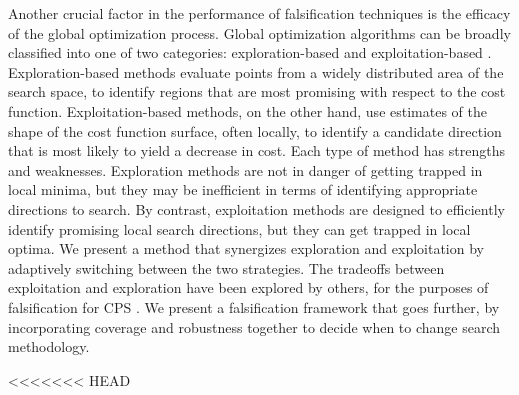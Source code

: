 

Another crucial factor in the performance of falsification techniques is the efficacy of the global optimization process.
Global optimization algorithms can be broadly classified into one of two
categories: exploration-based and exploitation-based \cite{Blum03}.
Exploration-based methods evaluate points from a widely distributed area 
of the search space, to identify regions that are most promising with 
respect to the cost function. Exploitation-based methods, on the other hand, 
use estimates of the shape of the cost function surface, often locally, to
identify a candidate direction that is most likely to yield a decrease
in cost. Each type of method has strengths and weaknesses. Exploration
methods are not in danger of getting trapped in local minima, but they may 
be inefficient in terms of identifying appropriate directions to search.  By
contrast, exploitation methods are designed to efficiently identify
promising local search directions, but they can get trapped in local optima.
We present a method that synergizes exploration and 
exploitation by adaptively switching between the two strategies.
The tradeoffs between exploitation and exploration have been explored by others, 
for the purposes of falsification for CPS \cite{Ratschan14}. We present a falsification framework that goes further, by incorporating coverage and robustness together to decide when to change search methodology.

<<<<<<< HEAD

